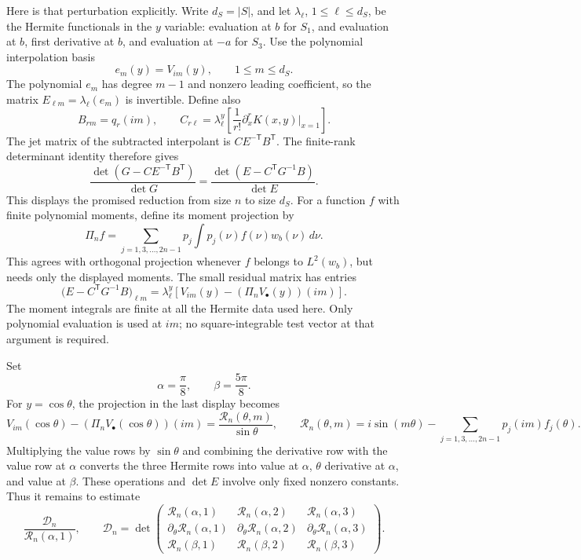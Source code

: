Here is that perturbation explicitly. Write $d_S=|S|$, and let
$\lambda_\ell$, $1\le \ell\le d_S$, be the Hermite functionals in the
$y$ variable: evaluation at $b$ for $S_1$, and evaluation at $b$,
first derivative at $b$, and evaluation at $-a$ for $S_3$.
Use the polynomial interpolation basis
\[
 e_m(y)=V_{im}(y),\qquad 1\le m\le d_S.
\]
The polynomial $e_m$ has degree $m-1$ and nonzero leading coefficient,
so the matrix $E_{\ell m}=\lambda_\ell(e_m)$ is invertible. Define also
\[
 B_{rm}=q_r(im),\qquad
 C_{r\ell}=\lambda_\ell^y\left[
           \frac1{r!}\partial_x^r K(x,y)\big|_{x=1}\right].
\]
The jet matrix of the subtracted interpolant is $CE^{-\mathsf T}B^{\mathsf T}$.
The finite-rank determinant identity therefore gives
\[
 \frac{\det(G-CE^{-\mathsf T}B^{\mathsf T})}{\det G}
 =\frac{\det(E-C^{\mathsf T}G^{-1}B)}{\det E}.
\]
This displays the promised reduction from size $n$ to size $d_S$.
For a function $f$ with finite polynomial moments, define its moment
projection by
\[
 \Pi_n f=\sum_{j=1,3,\ldots,2n-1}p_j\int p_j(\nu)f(\nu)w_b(\nu)\,d\nu.
\]
This agrees with orthogonal projection whenever $f$ belongs to $L^2(w_b)$,
but needs only the displayed moments. The small residual matrix has entries
\[
 \big(E-C^{\mathsf T}G^{-1}B\big)_{\ell m}
 =\lambda_\ell^y\left[V_{im}(y)
             -(\Pi_n V_{\bullet}(y))(im)\right].
\]
The moment integrals are finite at all the Hermite data used here.
Only polynomial evaluation is used at $im$; no square-integrable test
vector at that argument is required.

Set
\[
 \alpha=\frac\pi8,\qquad \beta=\frac{5\pi}8.
\]
For $y=\cos\theta$, the projection in the last display becomes
\[
 V_{im}(\cos\theta)
       -(\Pi_n V_{\bullet}(\cos\theta))(im)
 =\frac{\mathscr R_n(\theta,m)}{\sin\theta},
 \qquad
 \mathscr R_n(\theta,m)=i\sin(m\theta)
       -\sum_{j=1,3,\ldots,2n-1}p_j(im)f_j(\theta).
\]
Multiplying the value rows by $\sin\theta$ and combining the derivative
row with the value row at $\alpha$ converts the three Hermite rows into
value at $\alpha$, $\theta$ derivative at $\alpha$, and value at $\beta$.
These operations and $\det E$ involve only fixed nonzero constants.
Thus it remains to estimate
\[
 \frac{\mathscr D_n}{\mathscr R_n(\alpha,1)},\qquad
 \mathscr D_n=
 \det\begin{pmatrix}
 \mathscr R_n(\alpha,1)&\mathscr R_n(\alpha,2)&\mathscr R_n(\alpha,3)\\
 \partial_\theta \mathscr R_n(\alpha,1)&\partial_\theta \mathscr R_n(\alpha,2)&
                  \partial_\theta \mathscr R_n(\alpha,3)\\
 \mathscr R_n(\beta,1)&\mathscr R_n(\beta,2)&\mathscr R_n(\beta,3)
 \end{pmatrix}.
\]

